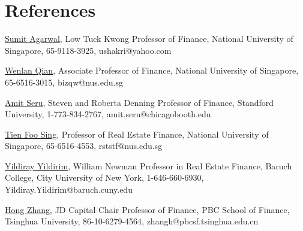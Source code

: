 \documentclass[margin,line]{res}
\newenvironment{list1}{
  \begin{list}{\ding{113}}{%
      \setlength{\itemsep}{0in}
      \setlength{\parsep}{0in} \setlength{\parskip}{0in}
      \setlength{\topsep}{0in} \setlength{\partopsep}{0in} 
      \setlength{\leftmargin}{0.17in}}}{\end{list}}
\begin{document}
\begin{resume}
\begin{enumerate}
\end{enumerate}


\section{\sc References}
\begin{list1}
	
	\item[] \href{http://bizfaculty.nus.edu/faculty-profiles/298-sumit}{\color{blue} Sumit Agarwal}, Low Tuck Kwong Professor of Finance, National University of Singapore, 65-9118-3925, ushakri@yahoo.com
	\item[] \href{http://bizfaculty.nus.edu/faculty-profiles/196-wenlan-qian}{\color{blue} Wenlan Qian}, Associate Professor of Finance, National University of Singapore, 65-6516-3015, bizqw@nus.edu.sg	
	\item[] \href{https://www.gsb.stanford.edu/faculty-research/faculty/amit-seru}{\color{blue} Amit Seru}, Steven and Roberta Denning Professor of Finance, Standford University, 1-773-834-2767, amit.seru@chicagobooth.edu
	\item[] \href{http://profile.nus.edu.sg/sde/rststf/stf_rststf.htm}{\color{blue} Tien Foo Sing},  Professor of Real Estate Finance, National University of Singapore, 65-6516-4553, rststf@nus.edu.sg 

	\item[] \href{https://zicklin.baruch.cuny.edu/faculty-profile/yildiray-yildirim/}{\color{blue} Yildiray Yildirim}, William Newman Professor in Real Estate Finance, Baruch College, City University of New York, 1-646-660-6930, Yildiray.Yildirim@baruch.cuny.edu
	\item[] \href{http://pbcsf.tsinghua.edu.cn/portal/article/index/id/1970.html}{\color{blue}  Hong Zhang}, JD Capital Chair Professor of Finance, PBC School of Finance, Tsinghua University, 86-10-6279-4564, zhangh@pbcsf.tsinghua.edu.cn	
\end{list1}
\fi



\end{resume}
\end{document}
